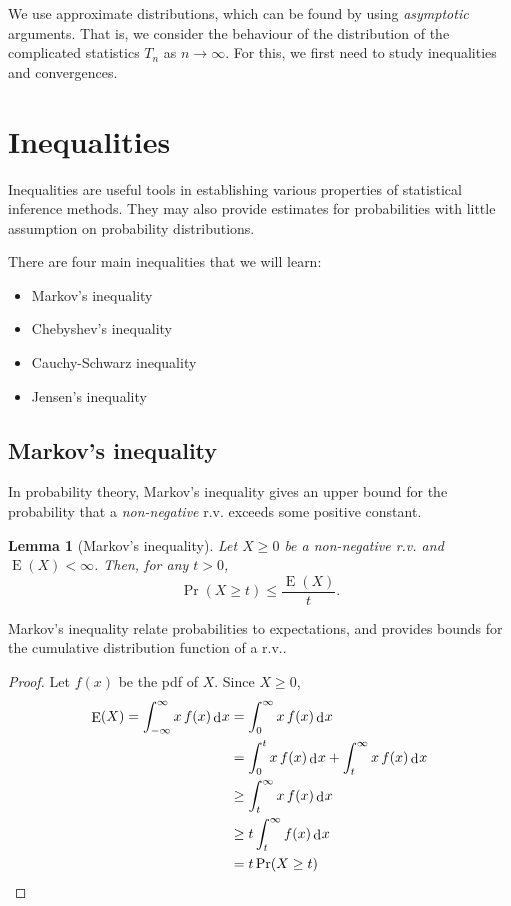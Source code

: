 \documentclass[
]{book}
\providecommand{\tightlist}{%
  \setlength{\itemsep}{0pt}\setlength{\parskip}{0pt}}
\DeclareMathOperator{\E}{E}
\DeclareMathOperator{\dd}{d}
\newcommand{\dint}{\dd\hspace{0.5pt}\!}
\newtheorem{lemma}{Lemma}[chapter]
\theoremstyle{definition}
\theoremstyle{definition}
\theoremstyle{definition}
\theoremstyle{definition}
\theoremstyle{remark}
\begin{document}
We use approximate distributions, which can be found by using \emph{asymptotic} arguments.
That is, we consider the behaviour of the distribution of the complicated statistics \(T_n\) as \(n\to\infty\).
For this, we first need to study inequalities and convergences.

\hypertarget{inequalities}{%
\section{Inequalities}\label{inequalities}}

Inequalities are useful tools in establishing various properties of statistical inference methods.
They may also provide estimates for probabilities with little assumption on probability distributions.

There are four main inequalities that we will learn:

\begin{itemize}
\tightlist
\item
  Markov's inequality
\item
  Chebyshev's inequality
\item
  Cauchy-Schwarz inequality
\item
  Jensen's inequality
\end{itemize}

\hypertarget{markovs-inequality}{%
\subsection{Markov's inequality}\label{markovs-inequality}}

In probability theory, Markov's inequality gives an upper bound for the
probability that a \emph{non-negative} r.v. exceeds some positive constant.

\begin{lemma}[Markov's inequality]
Let \(X\geq 0\) be a non-negative r.v. and \(\E(X) < \infty\). Then, for any
\(t>0\), \[\Pr(X\geq t) \leq \frac{\E(X)}{t}.\]
\end{lemma}

Markov's inequality relate probabilities to expectations, and provides
bounds for the cumulative distribution function of a r.v..

\begin{proof}
Let \(f(x)\) be the pdf of \(X\). Since \(X\geq 0\), \[\begin{aligned}
    \E(X) = \int_{-\infty}^{\infty} x\,f(x) \dint x &= \int_0^{\infty} x\,f(x) \dint x \\
    &= \int_0^t x\,f(x) \dint x + \int_t^\infty x\,f(x) \dint x \\
    &\geq \int_t^\infty x\,f(x) \dint x \\
    &\geq t\int_t^\infty f(x) \dint x \\
    &= t\Pr(X\geq t) 
  \end{aligned}\]
\end{proof}
\end{document}
